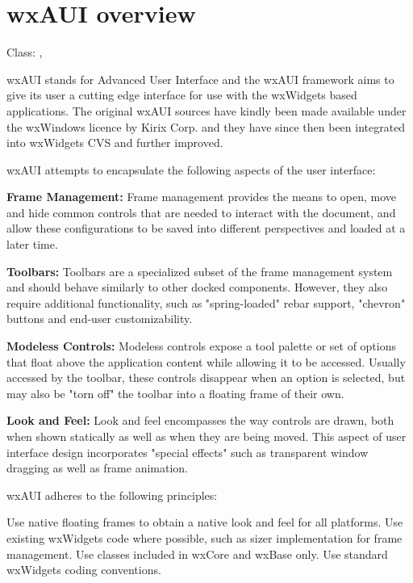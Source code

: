 \section{wxAUI overview}\label{wxauioverview}

Class: , 

wxAUI stands for Advanced User Interface and the wxAUI framework
aims to give its user a cutting edge interface for use with the
wxWidgets based applications. The original wxAUI sources have
kindly been made available under the wxWindows licence
by Kirix Corp. and they have since then been integrated into
wxWidgets CVS and further improved.

wxAUI attempts to encapsulate the following aspects of the user interface:

{\bf Frame Management:}
Frame management provides the means to open, move and hide common
controls that are needed to interact with the document, and allow these
configurations to be saved into different perspectives and loaded at a
later time.

{\bf Toolbars:}
Toolbars are a specialized subset of the frame management system and
should behave similarly to other docked components. However, they also
require additional functionality, such as "spring-loaded" rebar support,
"chevron" buttons and end-user customizability.

{\bf Modeless Controls:}
Modeless controls expose a tool palette or set of options that float
above the application content while allowing it to be accessed. Usually
accessed by the toolbar, these controls disappear when an option is
selected, but may also be "torn off" the toolbar into a floating frame
of their own.

{\bf Look and Feel:}
Look and feel encompasses the way controls are drawn, both when shown
statically as well as when they are being moved. This aspect of user
interface design incorporates "special effects" such as transparent
window dragging as well as frame animation.

wxAUI adheres to the following principles:

Use native floating frames to obtain a native look and feel for all
platforms. Use existing wxWidgets code where possible, such as sizer
implementation for frame management. Use classes included in wxCore
and wxBase only. Use standard wxWidgets coding conventions. 

